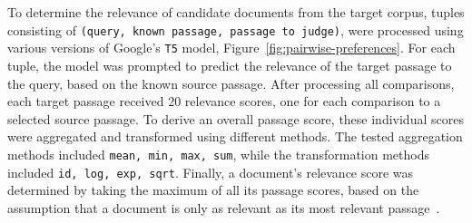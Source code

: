 \\\\
To determine the relevance of candidate documents from the target corpus, tuples consisting of \texttt{(query, known passage, passage to judge)}, were processed using various versions of Google's \texttt{T5} model, Figure~\ref{fig:pairwise-preferences}. For each tuple, the model was prompted to predict the relevance of the target passage to the query, based on the known source passage. After processing all comparisons, each target passage received 20 relevance scores, one for each comparison to a selected source passage. To derive an overall passage score, these individual scores were aggregated and transformed using different methods. The tested aggregation methods included \texttt{mean, min, max, sum}, while the transformation methods included \texttt{id, log, exp, sqrt}. Finally, a document's relevance score was determined by taking the maximum of all its passage scores, based on the assumption that a document is only as relevant as its most relevant passage~\citep{craswell:2019}.
